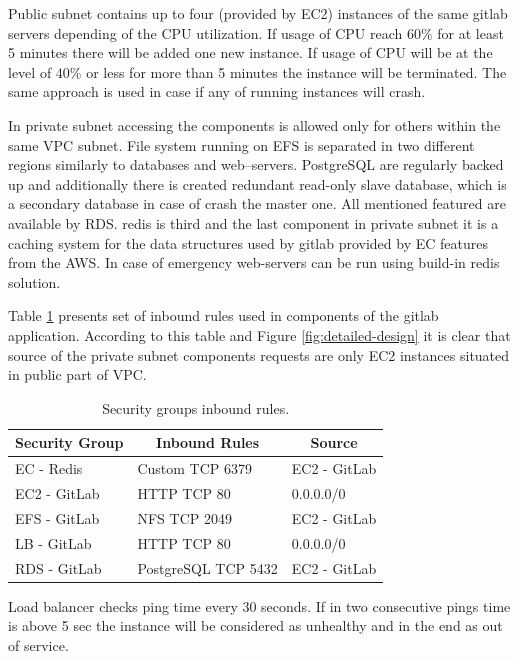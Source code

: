 	Public subnet contains up to four (provided by \gls{EC2}) instances of the same \gls{gitlab} servers depending of the CPU utilization. If usage of CPU reach $60\%$ for at least 5 minutes there will be added one new instance. If usage of CPU will be at the level of $40\%$ or less for more than 5 minutes the instance will be terminated. The same approach is used in case if any of running instances will crash.
	
	In private subnet accessing the components is allowed only for others within the same \gls{VPC} subnet. File system running on \gls{EFS} is separated in two different regions similarly to databases and web--servers. PostgreSQL are regularly backed up and additionally there is created redundant read-only slave database, which is a secondary database in case of crash the master one. All mentioned featured are available by \gls{RDS}. \gls{redis} is third and the last component in private subnet it is a caching system for the data structures used by \gls{gitlab} provided by \gls{EC} features from the \gls{AWS}. In case of emergency web-servers can be run using build-in \gls{redis} solution.
	
	Table \ref{tab:security-groups} presents set of inbound rules used in components of the \gls{gitlab} application. According to this table and Figure \ref{fig:detailed-design} it is clear that source of the private subnet components requests are only \gls{EC2} instances situated in public part of \gls{VPC}.
	\begin{table}[!htbp]
		\centering
		\caption{Security groups inbound rules.}
		\label{tab:security-groups}
		\begin{tabular}{|l|l|l|}
			\hline
			\multicolumn{1}{|c|}{\textbf{Security Group}} & \multicolumn{1}{c|}{\textbf{Inbound Rules}} & \multicolumn{1}{c|}{\textbf{Source}} \\ \hline
			EC - Redis & Custom TCP 6379 & EC2 - GitLab \\ \hline
			EC2 - GitLab & HTTP TCP 80 & 0.0.0.0/0 \\ \hline
			EFS - GitLab & NFS TCP 2049 & EC2 - GitLab \\ \hline
			LB - GitLab & HTTP TCP 80 & 0.0.0.0/0 \\ \hline
			RDS - GitLab & PostgreSQL TCP 5432 & EC2 - GitLab \\ \hline
		\end{tabular}
	\end{table}
	
	Load balancer checks ping time every $30$ seconds. If in two consecutive pings time is above 5 sec the instance will be considered as unhealthy and in the end as out of service.